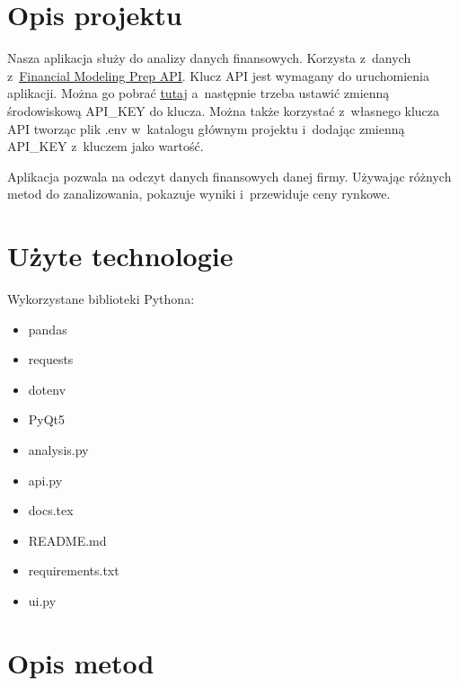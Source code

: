 \documentclass[12pt]{article}
\begin{document}
    \maketitle
    \tableofcontents
    \newpage


    \section{Opis projektu}\label{sec:opis-projektu}
    Nasza aplikacja służy do analizy danych finansowych.
    Korzysta z~danych
	z~\underline{\href{https://site.financialmodelingprep.com/developer/docs/}{Financial Modeling Prep API}}.
    Klucz API jest wymagany do uruchomienia aplikacji.
    Można go pobrać \underline{\href{https://site.financialmodelingprep.com/login}{tutaj}} a~następnie
    trzeba ustawić zmienną środowiskową API\_KEY do klucza.
    Można także korzystać z~własnego klucza API tworząc plik .env w~katalogu głównym projektu
    i~dodając zmienną API\_KEY z~kluczem jako wartość.

    Aplikacja pozwala na odczyt danych finansowych danej firmy.
    Używając różnych metod do zanalizowania, pokazuje wyniki i~przewiduje ceny rynkowe.


    \section{Użyte technologie}\label{sec:uzyte-echnologie}

    Wykorzystane biblioteki Pythona:
    \begin{itemize}
        \item pandas
        \item requests
        \item dotenv
        \item PyQt5
    \end{itemize}

    \begin{itemize}
        \item analysis.py
        \item api.py
        \item docs.tex
        \item README.md
        \item requirements.txt
        \item ui.py
    \end{itemize}


    \section{Opis metod}\label{sec:uzyte-metody}
\end{document}
